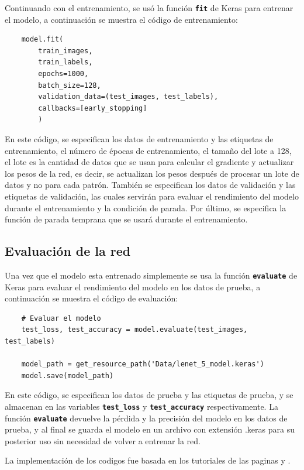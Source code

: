 Continuando con el entrenamiento, se usó la función \textbf{\texttt{fit}} de Keras para entrenar el modelo,
a continuación se muestra el código de entrenamiento:

\begin{lstlisting}
    model.fit(
        train_images, 
        train_labels, 
        epochs=1000, 
        batch_size=128, 
        validation_data=(test_images, test_labels), 
        callbacks=[early_stopping]
        )
\end{lstlisting}

En este código, se especifican los datos de entrenamiento y las etiquetas de entrenamiento, el número de épocas de entrenamiento,
el tamaño del lote a 128, el lote es la cantidad de datos que se usan para calcular el gradiente y actualizar los pesos de la red,
es decir, se actualizan los pesos después de procesar un lote de datos y no para cada patrón. 
También se especifican los datos de validación y las etiquetas de validación, las cuales servirán para evaluar el rendimiento del modelo
durante el entrenamiento y la condición de parada. 
Por último, se especifica la función de parada temprana que se usará durante el entrenamiento.

\subsection{Evaluación de la red}

Una vez que el modelo esta entrenado simplemente se usa la función \textbf{\texttt{evaluate}} de Keras para evaluar el rendimiento
del modelo en los datos de prueba, a continuación se muestra el código de evaluación:

\begin{lstlisting}
    # Evaluar el modelo
    test_loss, test_accuracy = model.evaluate(test_images, test_labels)
    
    model_path = get_resource_path('Data/lenet_5_model.keras')
    model.save(model_path)
\end{lstlisting}

En este código, se especifican los datos de prueba y las etiquetas de prueba, y se almacenan en las variables \textbf{\texttt{test\_loss}}
y \textbf{\texttt{test\_accuracy}} respectivamente. 
La función \textbf{\texttt{evaluate}} devuelve la pérdida y la precisión del modelo en los datos de prueba, y al final se guarda el modelo
en un archivo con extensión .keras para su posterior uso sin necesidad de volver a entrenar la red.
    
La implementación de los codigos fue basada en los tutoriales de las paginas \cite{d2l} y \cite{lenet_neha}.